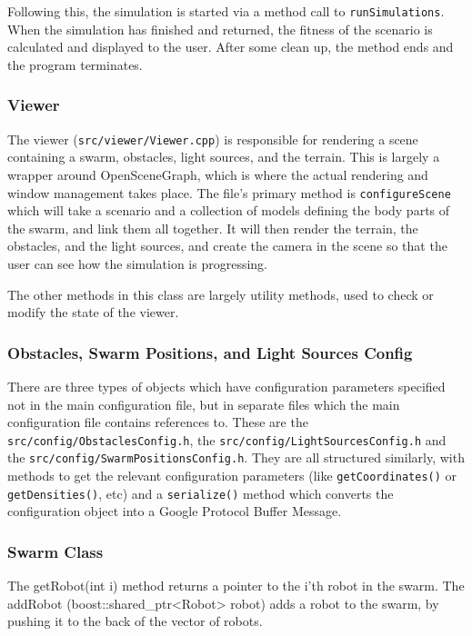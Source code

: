 \documentclass[11pt,a4paper]{article}
\begin{document}
Following this, the simulation is started via a method call to
\texttt{runSimulations}. When the simulation has finished and returned, the
fitness of the scenario is calculated and displayed to the user. After some
clean up, the method ends and the program terminates.

\subsubsection{Viewer}
The viewer (\texttt{src/viewer/Viewer.cpp}) is responsible for rendering a
scene containing a swarm, obstacles, light sources, and the terrain. This is
largely a wrapper around OpenSceneGraph, which is where the actual rendering
and window management takes place. The file's primary method is
\texttt{configureScene} which will take a scenario and a collection of models
defining the body parts of the swarm, and link them all together. It will then
render the terrain, the obstacles, and the light sources, and create the camera
in the scene so that the user can see how the simulation is progressing.

The other methods in this class are largely utility methods, used to check or
modify the state of the viewer.

\subsubsection{Obstacles, Swarm Positions, and Light Sources Config}
There are three types of objects which have configuration parameters specified
not in the main configuration file, but in separate files which the main
configuration file contains references to. These are the
\texttt{src/config/ObstaclesConfig.h}, the \texttt{src/config/LightSourcesConfig.h}
and the \texttt{src/config/SwarmPositionsConfig.h}. They are all structured
similarly, with methods to get the relevant configuration parameters (like
\texttt{getCoordinates()} or \texttt{getDensities()}, etc) and a
\texttt{serialize()} method which converts the configuration object into a
Google Protocol Buffer Message.


\subsubsection{Swarm Class}
The getRobot(int i) method returns a pointer to the i’th robot in the swarm.
The addRobot (boost::shared\_ptr<Robot> robot) adds a robot to the swarm, by
pushing it to the back of the vector of robots.
\end{document}
